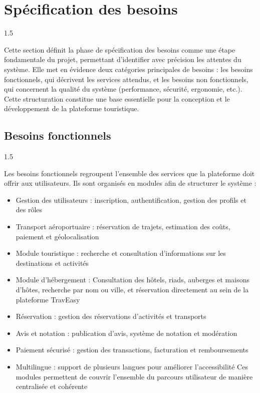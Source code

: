 \documentclass[a4paper,12pt]{report}
\begin{document}
\section{Spécification des besoins}
\vspace{0.5cm}
\begin{spacing}{1.5}
\justifying

Cette section définit la phase de spécification des besoins comme une étape fondamentale du projet, permettant d'identifier avec précision les attentes du système. Elle met en évidence deux catégories principales de besoins : les besoins fonctionnels, qui décrivent les services attendus, et les besoins non fonctionnels, qui concernent la qualité du système (performance, sécurité, ergonomie, etc.). Cette structuration constitue une base essentielle pour la conception et le développement de la plateforme touristique.


\subsection{Besoins fonctionnels}
\vspace{0.5cm}
\begin{spacing}{1.5}
\justifying

Les besoins fonctionnels regroupent l'ensemble des services que la plateforme doit offrir aux utilisateurs. Ils sont organisés en modules afin de structurer le système :

\begin{itemize}
    \item Gestion des utilisateurs : inscription, authentification, gestion des profils et des rôles
    \item Transport aéroportuaire : réservation de trajets, estimation des coûts, paiement et géolocalisation
    \item Module touristique : recherche et consultation d'informations sur les destinations et activités
    \item Module d'hébergement : Consultation des hôtels, riads, auberges et maisons d'hôtes, recherche par nom ou ville, et réservation directement au sein de la plateforme TravEasy
    \item Réservation : gestion des réservations d'activités et transports 
    \item Avis et notation : publication d'avis, système de notation et modération
    \item Paiement sécurisé : gestion des transactions, facturation et remboursements
    \item Multilingue : support de plusieurs langues pour améliorer l'accessibilité
 Ces modules permettent de couvrir l'ensemble du parcours utilisateur de manière centralisée et cohérente
\end{itemize}
\end{spacing}


\end{spacing}
\end{document}
